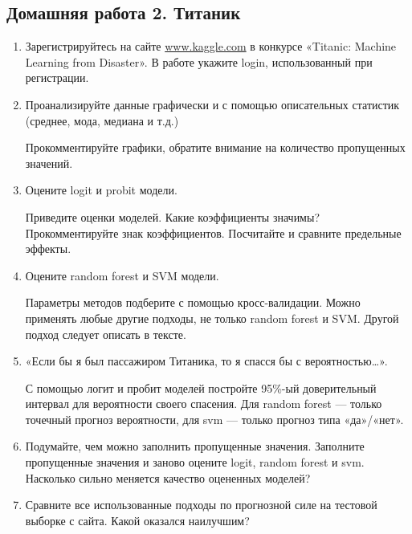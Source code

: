 \documentclass[12pt, a4paper]{article}\usepackage[]{graphicx}\usepackage[]{color}
\begin{document}
\subsection{Домашняя работа 2. Титаник}



\begin{enumerate}

\item Зарегистрируйтесь на сайте \url{www.kaggle.com}  в конкурсе «Titanic: Machine Learning from Disaster». В работе укажите login, использованный при регистрации.

\item Проанализируйте данные графически и с помощью описательных статистик (среднее, мода, медиана и т.д.)

Прокомментируйте графики, обратите внимание на количество пропущенных значений.

\item Оцените logit и probit модели.

Приведите оценки моделей. Какие коэффициенты значимы? Прокомментируйте знак коэффициентов. Посчитайте и сравните предельные эффекты.

\item Оцените random forest и SVM модели.

Параметры методов подберите с помощью кросс-валидации. Можно применять любые другие подходы, не только random forest и SVM. Другой подход следует описать в тексте.


\item «Если бы я был пассажиром Титаника, то я спасся бы с вероятностью\ldots».

С помощью логит и пробит моделей постройте 95\%-ый доверительный интервал для вероятности своего спасения. Для random forest — только точечный прогноз вероятности, для svm — только прогноз типа «да»/«нет».


\item Подумайте, чем можно заполнить пропущенные значения. Заполните пропущенные значения и заново оцените logit, random forest и svm. Насколько сильно меняется качество оцененных моделей?


\item Сравните все использованные подходы по прогнозной силе на тестовой выборке с сайта. Какой оказался наилучшим?


\end{enumerate}
\end{document}
